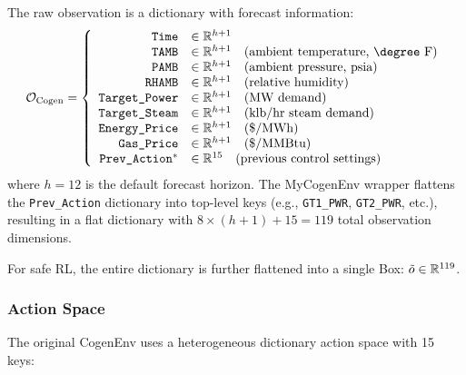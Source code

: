 The raw observation is a dictionary with forecast information:
\begin{equation}
    \calO_{\text{Cogen}} = \left\{
    \begin{array}{rl}
    \texttt{Time} & \in \R^{h+1} \\
    \texttt{TAMB} & \in \R^{h+1} \quad \text{(ambient temperature, \degree F)} \\
    \texttt{PAMB} & \in \R^{h+1} \quad \text{(ambient pressure, psia)} \\
    \texttt{RHAMB} & \in \R^{h+1} \quad \text{(relative humidity)} \\
    \texttt{Target\_Power} & \in \R^{h+1} \quad \text{(MW demand)} \\
    \texttt{Target\_Steam} & \in \R^{h+1} \quad \text{(klb/hr steam demand)} \\
    \texttt{Energy\_Price} & \in \R^{h+1} \quad \text{(\$/MWh)} \\
    \texttt{Gas\_Price} & \in \R^{h+1} \quad \text{(\$/MMBtu)} \\
    \texttt{Prev\_Action}^* & \in \R^{15} \quad \text{(previous control settings)}
    \end{array}\right.
    \label{eq:cogen_obs}
\end{equation}
where $h = 12$ is the default forecast horizon. The MyCogenEnv wrapper flattens the \texttt{Prev\_Action} dictionary into top-level keys (e.g., \texttt{GT1\_PWR}, \texttt{GT2\_PWR}, etc.), resulting in a flat dictionary with $8 \times (h+1) + 15 = 119$ total observation dimensions.

For safe RL, the entire dictionary is further flattened into a single Box: $\tilde{o} \in \mathbb{R}^{119}$.

\subsubsection{Action Space}

The original CogenEnv uses a heterogeneous dictionary action space with 15 keys:

